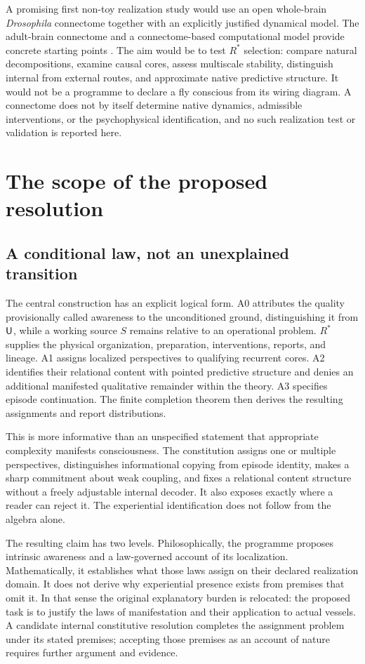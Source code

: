 A promising first non-toy realization study would use an open whole-brain \emph{Drosophila} connectome together with an explicitly justified dynamical model. The adult-brain connectome and a connectome-based computational model provide concrete starting points \cite{Dorkenwald2024,Shiu2024}. The aim would be to test $R^\ast$ selection: compare natural decompositions, examine causal cores, assess multiscale stability, distinguish internal from external routes, and approximate native predictive structure. It would not be a programme to declare a fly conscious from its wiring diagram. A connectome does not by itself determine native dynamics, admissible interventions, or the psychophysical identification, and no such realization test or validation is reported here.

\chapter{The scope of the proposed resolution}\label{ch:resolution}
\section{A conditional law, not an unexplained transition}\label{section:resolution:a-conditional-law-not-an-unexplained-transition}
The central construction has an explicit logical form. A0 attributes the quality provisionally called awareness to the unconditioned ground, distinguishing it from $\mathsf{U}$, while a working source $S$ remains relative to an operational problem. $R^\ast$ supplies the physical organization, preparation, interventions, reports, and lineage. A1 assigns localized perspectives to qualifying recurrent cores. A2 identifies their relational content with pointed predictive structure and denies an additional manifested qualitative remainder within the theory. A3 specifies episode continuation. The finite completion theorem then derives the resulting assignments and report distributions.

This is more informative than an unspecified statement that appropriate complexity manifests consciousness. The constitution assigns one or multiple perspectives, distinguishes informational copying from episode identity, makes a sharp commitment about weak coupling, and fixes a relational content structure without a freely adjustable internal decoder. It also exposes exactly where a reader can reject it. The experiential identification does not follow from the algebra alone.

The resulting claim has two levels. Philosophically, the programme proposes intrinsic awareness and a law-governed account of its localization. Mathematically, it establishes what those laws assign on their declared realization domain. It does not derive why experiential presence exists from premises that omit it. In that sense the original explanatory burden is relocated: the proposed task is to justify the laws of manifestation and their application to actual vessels. A candidate internal constitutive resolution completes the assignment problem under its stated premises; accepting those premises as an account of nature requires further argument and evidence.

